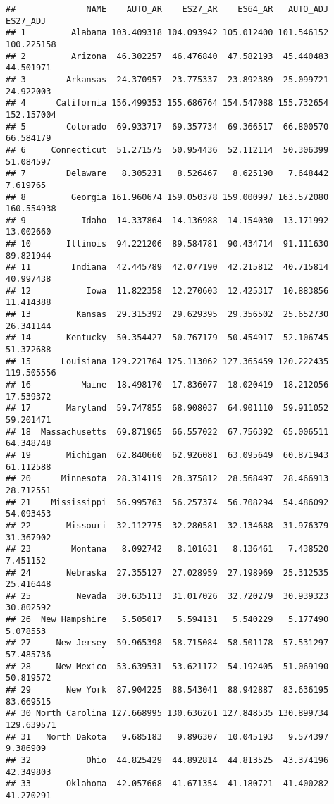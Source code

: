 \documentclass[
]{article}
\begin{document}
\begin{verbatim}
##              NAME    AUTO_AR    ES27_AR    ES64_AR   AUTO_ADJ   ES27_ADJ
## 1         Alabama 103.409318 104.093942 105.012400 101.546152 100.225158
## 2         Arizona  46.302257  46.476840  47.582193  45.440483  44.501971
## 3        Arkansas  24.370957  23.775337  23.892389  25.099721  24.922003
## 4      California 156.499353 155.686764 154.547088 155.732654 152.157004
## 5        Colorado  69.933717  69.357734  69.366517  66.800570  66.584179
## 6     Connecticut  51.271575  50.954436  52.112114  50.306399  51.084597
## 7        Delaware   8.305231   8.526467   8.625190   7.648442   7.619765
## 8         Georgia 161.960674 159.050378 159.000997 163.572080 160.554938
## 9           Idaho  14.337864  14.136988  14.154030  13.171992  13.002660
## 10       Illinois  94.221206  89.584781  90.434714  91.111630  89.821944
## 11        Indiana  42.445789  42.077190  42.215812  40.715814  40.997438
## 12           Iowa  11.822358  12.270603  12.425317  10.883856  11.414388
## 13         Kansas  29.315392  29.629395  29.356502  25.652730  26.341144
## 14       Kentucky  50.354427  50.767179  50.454917  52.106745  51.372688
## 15      Louisiana 129.221764 125.113062 127.365459 120.222435 119.505556
## 16          Maine  18.498170  17.836077  18.020419  18.212056  17.539372
## 17       Maryland  59.747855  68.908037  64.901110  59.911052  59.201471
## 18  Massachusetts  69.871965  66.557022  67.756392  65.006511  64.348748
## 19       Michigan  62.840660  62.926081  63.095649  60.871943  61.112588
## 20      Minnesota  28.314119  28.375812  28.568497  28.466913  28.712551
## 21    Mississippi  56.995763  56.257374  56.708294  54.486092  54.093453
## 22       Missouri  32.112775  32.280581  32.134688  31.976379  31.367902
## 23        Montana   8.092742   8.101631   8.136461   7.438520   7.451152
## 24       Nebraska  27.355127  27.028959  27.198969  25.312535  25.416448
## 25         Nevada  30.635113  31.017026  32.720279  30.939323  30.802592
## 26  New Hampshire   5.505017   5.594131   5.540229   5.177490   5.078553
## 27     New Jersey  59.965398  58.715084  58.501178  57.531297  57.485736
## 28     New Mexico  53.639531  53.621172  54.192405  51.069190  50.819572
## 29       New York  87.904225  88.543041  88.942887  83.636195  83.669515
## 30 North Carolina 127.668995 130.636261 127.848535 130.899734 129.639571
## 31   North Dakota   9.685183   9.896307  10.045193   9.574397   9.386909
## 32           Ohio  44.825429  44.892814  44.813525  43.374196  42.349803
## 33       Oklahoma  42.057668  41.671354  41.180721  41.400282  41.270291

\end{verbatim}
\end{document}
